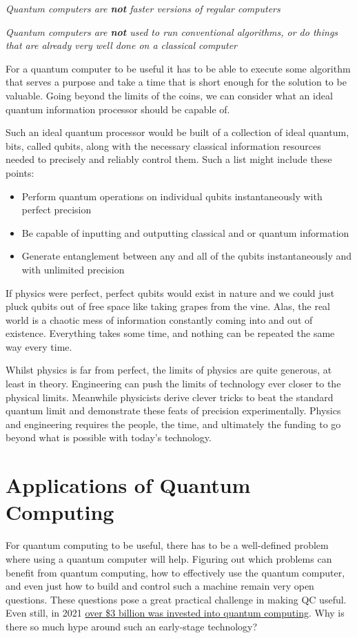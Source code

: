 \documentclass{book}
\begin{document}
\emph{Quantum computers are \textbf{not} faster versions of regular computers}

\emph{ Quantum computers are \textbf{not} used to run conventional algorithms, or do things that are already very well done on a classical computer }

For a quantum computer to be useful it has to be able to execute some algorithm that serves a purpose and take a time that is short enough for the solution to be valuable. Going beyond the limits of the coins, we can consider what an ideal quantum information processor should be capable of. 

Such an ideal quantum processor would be built of a collection of ideal quantum, bits, called qubits, along with the necessary classical information resources needed to precisely and reliably control them. Such a list might include these points:

\begin{itemize}
\item Perform quantum operations on individual qubits instantaneously with perfect precision
\item Be capable of inputting and outputting classical and or quantum information
\item Generate entanglement between any and all of the qubits instantaneously and with unlimited precision 
\end{itemize}

If physics were perfect, perfect qubits would exist in nature and we could just pluck qubits out of free space like taking grapes from the vine. Alas, the real world is a chaotic mess of information constantly coming into and out of existence. Everything takes some time, and nothing can be repeated the same way every time. 

Whilst physics is far from perfect, the limits of physics are quite generous, at least in theory. Engineering can push the limits of technology ever closer to the physical limits. Meanwhile physicists derive clever tricks to beat the standard quantum limit and demonstrate these feats of precision experimentally. Physics and engineering requires the people, the time, and ultimately the funding to go beyond what is possible with today's technology. 

\section{Applications of Quantum Computing}


For quantum computing to be useful, there has to be a well-defined problem where using a quantum computer will help. Figuring out which problems can benefit from quantum computing, how to effectively use the quantum computer, and even just how to build and control such a machine remain very open questions. These questions pose a great practical challenge in making QC useful. Even still, in 2021 \href{https://www.mckinsey.com/business-functions/mckinsey-digital/our-insights/quantum-computing-funding-remains-strong-but-talent-gap-raises-concern}{over \$3 billion was invested into quantum computing}. Why is there so much hype around such an early-stage technology? 
\end{document}
